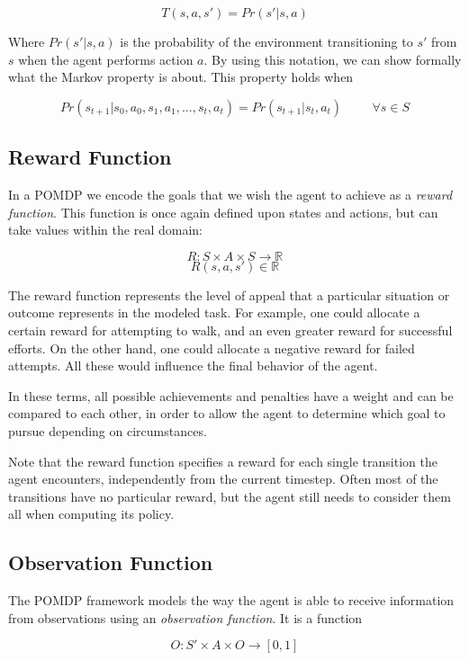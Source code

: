 \[ T(s, a, s') = Pr(s' | s, a) \]

Where $Pr(s'|s,a)$ is the probability of the environment transitioning to $s'$ from $s$ when the
agent performs action $a$. By using this notation, we can show formally what the Markov property is
about. This property holds when

\[ Pr(s_{t+1} | s_{0}, a_{0}, s_{1}, a_{1}, ..., s_{t}, a_{t} ) = Pr(s_{t+1} | s_t, a_t ) \hspace{1cm} \forall s \in S \]

\subsection{Reward Function}

In a POMDP we encode the goals that we wish the agent to achieve as a \textit{reward function}.
This function is once again defined upon states and actions, but can take values within the real
domain:

\[ R: S\times A\times S \rightarrow \mathbb{R} \]
\[ R(s, a, s') \in \mathbb{R} \]

The reward function represents the level of appeal that a particular situation or outcome represents
in the modeled task. For example, one could allocate a certain reward for attempting to walk, and an
even greater reward for successful efforts. On the other hand, one could allocate a negative reward
for failed attempts. All these would influence the final behavior of the agent.

In these terms, all possible achievements and penalties have a weight and can be compared to each
other, in order to allow the agent to determine which goal to pursue depending on circumstances.

Note that the reward function specifies a reward for each single transition the agent encounters,
independently from the current timestep. Often most of the transitions have no particular reward,
but the agent still needs to consider them all when computing its policy.

\subsection{Observation Function}

The POMDP framework models the way the agent is able to receive information from observations using
an \textit{observation function}. It is a function

\[ O : S' \times A \times O \rightarrow [0,1] \]

